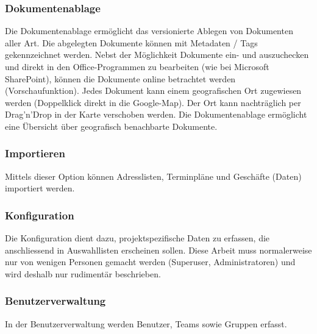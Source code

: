 \subsubsection{Dokumentenablage}

Die Dokumentenablage ermöglicht das versionierte Ablegen von Dokumenten aller Art. Die abgelegten Dokumente können mit Metadaten / Tags gekennzeichnet werden. Nebst der Möglichkeit Dokumente ein- und auszuchecken und direkt in den Office-Programmen zu bearbeiten (wie bei Microsoft SharePoint), können die Dokumente online betrachtet werden (Vorschaufunktion). Jedes Dokument kann einem geografischen Ort zugewiesen werden (Doppelklick direkt in die Google-Map). Der Ort kann nachträglich per Drag’n’Drop in der Karte verschoben werden. Die Dokumentenablage ermöglicht eine Übersicht über geografisch benachbarte Dokumente.

\subsubsection{Importieren}

Mittels dieser Option können Adresslisten, Terminpläne und Geschäfte (Daten) importiert werden.

\subsubsection{Konfiguration}

Die Konfiguration dient dazu, projektspezifische Daten zu erfassen, die anschliessend in Auswahllisten erscheinen sollen. Diese Arbeit muss normalerweise nur von wenigen Personen gemacht werden (Superuser, Administratoren) und wird deshalb nur rudimentär beschrieben.

\subsubsection{Benutzerverwaltung}

In der Benutzerverwaltung werden Benutzer, Teams sowie Gruppen erfasst.

